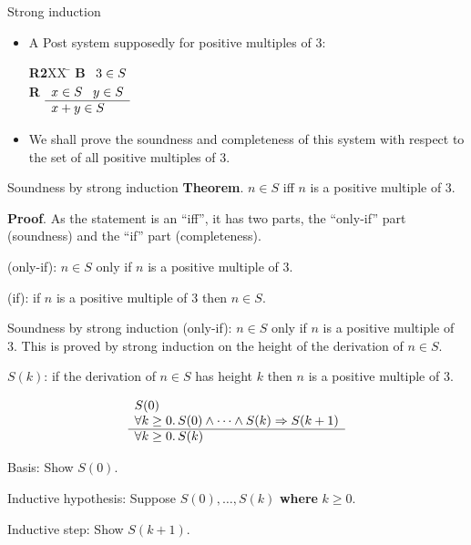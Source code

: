 \documentclass[style=sailor,size=12pt]{powerdot}
\begin{document}
\begin{wideslide}[bm=,toc=]{Strong induction}
\begin{itemize}
\item A Post system supposedly for positive multiples of 3:
\vspace{-1em}
\begin{tabbing}
{\bf R2}XX \=  \kill
{\bf B} \>
        \(\begin{array}[t]{l}
        3\in S
        \end{array}\) \\[2ex]
{\bf R} \>
        \(\begin{array}[t]{l}
        x \in S \;\;\;y \in S \\
        \hline
        x + y \in S
        \end{array}\)
\end{tabbing}
\item We shall prove the soundness and completeness of this system with respect to
the set of all positive multiples of 3.
\end{itemize}
\end{wideslide}

\begin{wideslide}[bm=,toc=]{Soundness by strong induction}
{\bf Theorem}. $n\in S$ iff $n$ is a positive multiple of 3.
\vspace{1em}

{\bf Proof}.  As the statement is an ``iff'', it has two parts, the ``only-if'' part (soundness)
and the ``if'' part (completeness).

\vspace{1em} 
(only-if): $n\in S$ only if $n$ is a positive multiple of 3.

\vspace{1em} 
(if): if $n$ is a positive multiple of 3 then $n\in S$. 
\end{wideslide}


\begin{wideslide}[bm=,toc=]{Soundness by strong induction}
(only-if): $n\in S$ only if $n$ is a positive multiple of 3.
This is proved by strong induction on the height of the derivation of $n\in S$.

\vspace{1em}
$S(k)$: if the derivation of $n\in S$ has height $k$ then $n$ is a positive multiple of 3.

\begin{displaymath}
\begin{array}[t]{l}
S(0) \\
\forall k\geq 0.\, S(0)\wedge \cdots \wedge S(k)\Rightarrow S(k+1) \\
\hline
\forall k\geq 0.\, S(k)
\end{array}
\end{displaymath}

\vspace{1em}
Basis: Show $S(0)$.

\vspace{1em}
Inductive hypothesis: Suppose $S(0),\ldots ,S(k)$ {\bf where} $k\geq 0$.

\vspace{1em}
Inductive step: Show $S(k+1)$.
\end{wideslide}
\end{document}
